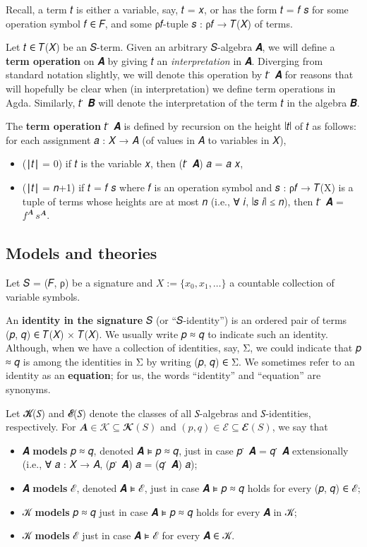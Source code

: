 \documentclass[sigplan,screen]{acmart}
\begin{document}

Recall, a term 𝑡 is either a variable, say, 𝑡 = 𝑥, or has the form 𝑡 = 𝑓 𝑠 for some operation symbol 𝑓 ∈ 𝐹, and some ρ𝑓-tuple 𝑠 : ρ𝑓 → 𝑇(𝑋) of terms.

Let 𝑡 ∈ 𝑇(𝑋) be an 𝑆-term. Given an arbitrary 𝑆-algebra 𝑨, we will define a \textbf{term operation} on 𝑨 by giving 𝑡 an \emph{interpretation} in 𝑨. Diverging from standard notation slightly, we will denote this operation by 𝑡 ̇ 𝑨 for reasons that will hopefully be clear when (in interpretation) we define term operations in Agda. Similarly, 𝑡 ̇ 𝑩 will denote the interpretation of the term 𝑡 in the algebra 𝑩.

The \textbf{term operation} 𝑡 ̇ 𝑨 is defined by recursion on the height ∣𝑡∣ of 𝑡 as follows: for each assignment 𝑎 : 𝑋 → 𝐴 (of values in 𝐴 to variables in 𝑋),
\begin{itemize}
\item (∣𝑡∣ = 0) if 𝑡 is the variable 𝑥, then (𝑡 ̇ 𝑨) 𝑎 = 𝑎 𝑥,
\item (∣𝑡∣ = 𝑛+1) if 𝑡 = 𝑓 𝑠 where 𝑓 is an operation symbol and 𝑠 : ρ𝑓 → 𝑇(X) is a tuple of terms whose heights are at most 𝑛 (i.e., ∀ 𝑖, ∣𝑠 𝑖∣ ≤ 𝑛), then 𝑡 ̇ 𝑨 = \(f^𝑨 \, s^𝑨\).
\end{itemize}

\subsection{Models and theories}\label{models-and-theories}
Let 𝑆 = (𝐹, ρ) be a signature and \(X := \{x_0, x_1, \dots\}\) a countable collection of variable symbols.

An \textbf{identity in the signature} 𝑆 (or ``𝑆-identity'') is an ordered pair of terms (𝑝, 𝑞) ∈ 𝑇(𝑋) × 𝑇(𝑋). We usually write 𝑝 ≈ 𝑞 to indicate such an identity. Although, when we have a collection of identities, say, Σ, we could indicate that 𝑝 ≈ 𝑞 is among the identities in Σ by writing (𝑝, 𝑞) ∈ Σ. We sometimes refer to an identity as an \textbf{equation}; for us, the words ``identity'' and ``equation'' are synonyms.

Let 𝓚(𝑆) and 𝓔(𝑆) denote the classes of all 𝑆-algebras and 𝑆-identities, respectively. For \(𝑨 ∈ 𝒦 ⊆ 𝓚(𝑆)\) and \((𝑝, 𝑞) ∈ ℰ ⊆ 𝓔(𝑆)\), we say that
\begin{itemize}
\item 𝑨 \textbf{models} 𝑝 ≈ 𝑞, denoted 𝑨 ⊧ 𝑝 ≈ 𝑞, just in case 𝑝 ̇ 𝑨 = 𝑞 ̇ 𝑨 extensionally (i.e., ∀ 𝑎 : 𝑋 → 𝐴, (𝑝 ̇ 𝑨) 𝑎 = (𝑞 ̇ 𝑨) 𝑎);
\item 𝑨 \textbf{models} ℰ, denoted 𝑨 ⊧ ℰ, just in case 𝑨 ⊧ 𝑝 ≈ 𝑞 holds for every (𝑝, 𝑞) ∈ ℰ;
\item 𝒦 \textbf{models} 𝑝 ≈ 𝑞 just in case 𝑨 ⊧ 𝑝 ≈ 𝑞 holds for every 𝑨 in 𝒦;
\item 𝒦 \textbf{models} ℰ just in case 𝑨 ⊧ ℰ for every 𝑨 ∈ 𝒦.
\end{itemize}
\end{document}
